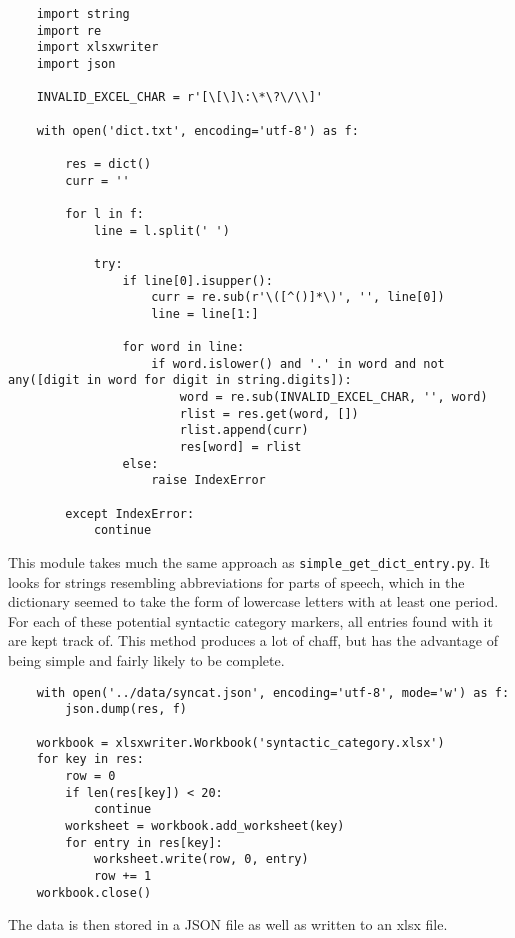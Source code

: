 \documentclass{article}      %
\begin{document}
	\begin{verbatim}
	import string
	import re
	import xlsxwriter
	import json
	
	INVALID_EXCEL_CHAR = r'[\[\]\:\*\?\/\\]'
	
	with open('dict.txt', encoding='utf-8') as f:
	
		res = dict()
		curr = ''
		
		for l in f:
			line = l.split(' ')
			
			try:
				if line[0].isupper():
					curr = re.sub(r'\([^()]*\)', '', line[0])
					line = line[1:]
				
				for word in line:
					if word.islower() and '.' in word and not any([digit in word for digit in string.digits]):
						word = re.sub(INVALID_EXCEL_CHAR, '', word)
						rlist = res.get(word, [])
						rlist.append(curr)
						res[word] = rlist
				else:
					raise IndexError
		
		except IndexError:
			continue
	\end{verbatim}
	
	This module takes much the same approach as \texttt{simple\_get\_dict\_entry.py}. It looks for strings resembling abbreviations for parts of speech, which in the dictionary seemed to take the form of lowercase letters with at least one period. For each of these potential syntactic category markers, all entries found with it are kept track of. This method produces a lot of chaff, but has the advantage of being simple and fairly likely to be complete.
	
	\begin{verbatim}
	with open('../data/syncat.json', encoding='utf-8', mode='w') as f:
		json.dump(res, f)
	
	workbook = xlsxwriter.Workbook('syntactic_category.xlsx')
	for key in res:
		row = 0
		if len(res[key]) < 20:
			continue
		worksheet = workbook.add_worksheet(key)
		for entry in res[key]:
			worksheet.write(row, 0, entry)
			row += 1
	workbook.close()
	\end{verbatim}
	
	The data is then stored in a JSON file as well as written to an xlsx file.
	
\end{document}
